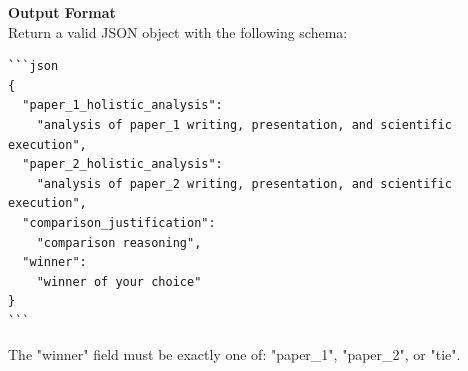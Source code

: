 \vspace{1em}
\noindent\textbf{Output Format}\\
\vspace{0.5em}
Return a valid JSON object with the following schema:

\begin{verbatim}
```json
{
  "paper_1_holistic_analysis": 
    "analysis of paper_1 writing, presentation, and scientific execution",
  "paper_2_holistic_analysis": 
    "analysis of paper_2 writing, presentation, and scientific execution",
  "comparison_justification": 
    "comparison reasoning",
  "winner": 
    "winner of your choice"
}
```
\end{verbatim}

\noindent The "winner" field must be exactly one of: "paper\_1", "paper\_2", or "tie".